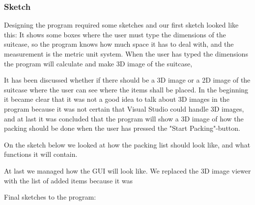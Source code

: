 \subsubsection{Sketch}

Designing the program required some sketches and our first sketch looked like this:
It shows some boxes where the user must type the dimensions of the suitcase, so the program knows how much space it has to deal with, and the measurement is the metric unit system.
When the user has typed the dimensions the program will calculate and make 3D image of the suitcase, 


It has been discussed whether if there should be a 3D image or a 2D image of the suitcase where the user can see where the items shall be placed. In the beginning it became clear that it was not a good idea to talk about 3D images in the program because it was not certain that Visual Studio could handle 3D images, and at last it was concluded that the program will show a 3D image of how the packing should be done when the user has pressed the "Start Packing"-button.



On the sketch below we looked at how the packing list should look like, and what functions it will contain.


At last we managed how the GUI will look like. We replaced the 3D image viewer with the list of added items because it was 





Final sketches to the program:






